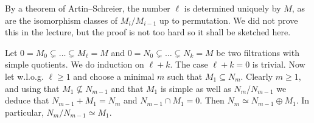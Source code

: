 \documentclass[a4paper,parskip=half,numbers=enddot, DIV=12]{scrreprt}
\begin{document}
\begin{rem}
    \begin{alphanumerate}
    \item {}
        By a theorem of Artin--Schreier, the number $\ell$ is determined uniquely by $M$, as are the isomorphism classes of $M_i/M_{i-1}$ up to permutation. We did not prove this in the lecture, but the proof is not too hard so it shall be sketched here.
        
        Let $0=M_0\subsetneq \ldots\subsetneq M_\ell=M$ and $0=N_0\subsetneq\ldots\subsetneq N_k=M$ be two filtrations with simple quotients. We do induction on $\ell+k$. The case $\ell+k=0$ is trivial. Now let w.l.o.g. $\ell\geq1$ and choose  a minimal $m$ such that $M_1\subseteq N_m$. Clearly $m\geq 1$, and using that $M_1\not\subseteq N_{m-1}$ and that $M_1$ is simple as well as $N_m/N_{m-1}$ we deduce that $N_{m-1}+M_1=N_m$ and $N_{m-1}\cap M_1=0$. Then $N_m\simeq N_{m-1}\oplus M_1$. In particular, $N_m/N_{m-1}\simeq M_1$.
        

\end{alphanumerate}
\end{rem}
\end{document}

